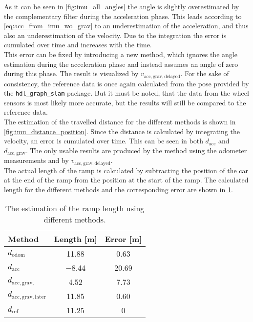 As it can be seen in \cref{fig:imu_all_angles} the angle is slightly overestimated by the complementary filter during the acceleration phase.
This leads according to \cref{eq:acc_from_imu_wo_grav} to an underestimation of the acceleration, and thus also an underestimation of the velocity.
Due to the integration the error is cumulated over time and increases with the time.\\
This error can be fixed by introducing a new method, which ignores the angle estimation during the acceleration phase and instead assumes an angle of zero during this phase.
The result is visualized by $v_\mathrm{acc, grav, delayed}$.
For the sake of consistency, the reference data is once again calculated from the pose provided by the \texttt{hdl\_graph\_slam} package.
But it must be noted, that the data from the wheel sensors is most likely more accurate, but the results will still be compared to the reference data.\\
The estimation of the travelled distance for the different methods is shown in \cref{fig:imu_distance_position}.
Since the distance is calculated by integrating the velocity, an error is cumulated over time.
This can be seen in both $d_\mathrm{acc}$ and $d_\mathrm{acc, grav}$.
The only usable results are produced by the method using the odometer measurements and by $v_\mathrm{acc, grav, delayed}$.\\
The actual length of the ramp is calculated by subtracting the position of the car at the end of the ramp from the position at the start of the ramp.
The calculated length for the different methods and the corresponding error are shown in \cref{tab:ramp_length}.
\begin{table}[htb]
	\centering
	\caption[Ramp length estimation]{The estimation of the ramp length using different methods.}
	\label{tab:ramp_length}
	\begin{tabular}[t]{lcc}
		\toprule
		\textbf{Method}                & \textbf{Length} [\si{\metre}] & \textbf{Error} [\si{\metre}] \\
		\midrule
		$d_\mathrm{odom} $             & \SI{11.88}{}                  & \SI{0.63}{}                  \\
		$d_\mathrm{acc} $              & \SI{-8.44}{}                  & \SI{20.69}{}                 \\
		$d_\mathrm{acc, grav, } $      & \SI{4.52}{}                   & \SI{7.73}{}                  \\
		$d_\mathrm{acc, grav, later} $ & \SI{11.85}{}                  & \SI{0.60}{}                  \\
		$d_\mathrm{ref} $              & \SI{11.25}{}                  & \SI{0}{}                     \\
		\bottomrule
	\end{tabular}
\end{table}



